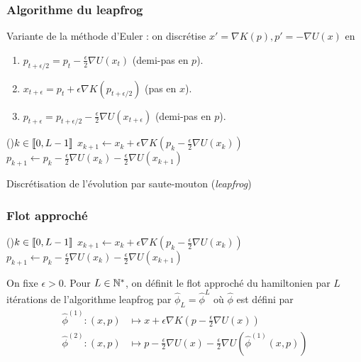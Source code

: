 \documentclass[10pt]{beamer}
\begin{document}
\begin{frame}
	\frametitle{Algorithme du leapfrog}
	Variante de la méthode d'Euler : on discrétise $x' = \nabla K(p), p' = - \nabla U(x)$ en
	\begin{enumerate}
		\item $p_{t+\epsilon/2} = p_t - \frac{\epsilon}{2} \nabla U(x_t)$ (demi-pas en $p$).
		\item $x_{t+\epsilon} = p_t + \epsilon \nabla K(p_{t+\epsilon/2})$ (pas en $x$).
		\item $p_{t+\epsilon} = p_{t+\epsilon/2} - \frac{\epsilon}{2} \nabla U(x_{t+\epsilon})$ (demi-pas en $p$).
	\end{enumerate}
	\begin{center}
		\begin{algorithm}[H]
			\For(){$k \in {\left\llbracket 0, L-1 \right\rrbracket}$}{
				$x_{k+1} \leftarrow x_k + \epsilon \nabla K \left( p_k - \frac{\epsilon}{2} \nabla U(x_k) \right)$\;
				$p_{k+1} \leftarrow p_k - \frac{\epsilon}{2} \nabla U(x_k) - \frac{\epsilon}{2} \nabla U(x_{k+1})$\;
			}
			\caption{Discrétisation de l'évolution par saute-mouton ({\it leapfrog})}
			\label{algo:leapfrog}
		\end{algorithm}
	\end{center}
\end{frame}

\begin{frame}
	\frametitle{Flot approché}
	\begin{center} %
		\small
		\begin{algorithm}[H]
			\For(){$k \in {\left\llbracket 0, L-1 \right\rrbracket}$}{
				$x_{k+1} \leftarrow x_k + \epsilon \nabla K \left( p_k - \frac{\epsilon}{2} \nabla U(x_k) \right)$\;
				$p_{k+1} \leftarrow p_k - \frac{\epsilon}{2} \nabla U(x_k) - \frac{\epsilon}{2} \nabla U(x_{k+1})$\;
			}
			\label{algo:leapfrog}
		\end{algorithm}
	\end{center}
	\begin{Def} \label{def:flot_approche}
		On fixe $\epsilon > 0$. Pour $L \in \mathbb{N}^*$, on définit le flot approché du hamiltonien par $L$ itérations de l'algorithme leapfrog par $\hat{\phi}_L = \hat{\phi}^L$ où $\hat \phi$ est défini par
		\begin{align*}
		\hat{\phi}^{(1)} : (x,p) & \mapsto x + \epsilon \nabla K \left( p - \frac{\epsilon}{2} \nabla U(x) \right) \\
		\hat{\phi}^{(2)} : (x,p) & \mapsto p - \frac{\epsilon}{2} \nabla U(x) - \frac{\epsilon}{2} \nabla U(\hat{\phi}^{(1)}(x,p))
		\end{align*}
	\end{Def}
\end{frame}
\end{document}
